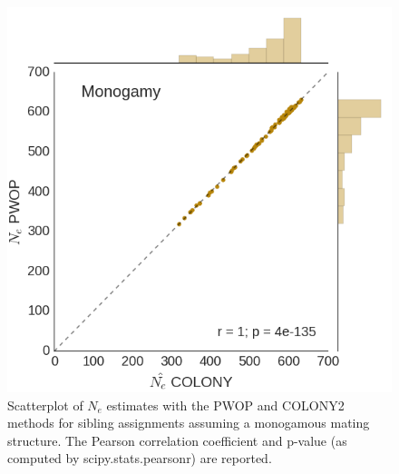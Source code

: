 \documentclass{article}
\begin{document}
\begin{figure}[h!]
  \caption{Scatterplot of $N_e$ estimates with the PWOP and COLONY2 methods for sibling assignments assuming a monogamous mating structure.  The Pearson correlation coefficient and p-value (as computed by scipy.stats.pearsonr) are reported.}
  \centering
  \includegraphics[width=\textwidth]{./Monogamy_mating.png}
\end{figure}

\newpage
\end{document}
